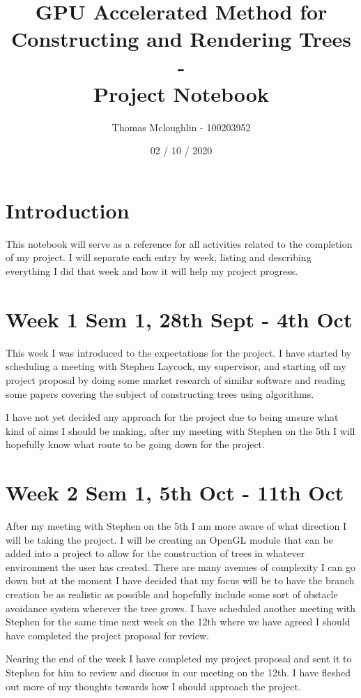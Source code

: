 \documentclass[11pt]{article}
\title{GPU Accelerated Method for Constructing and Rendering Trees 
        \\ - \\ 
        Project Notebook}
\author{Thomas Mcloughlin - 100203952}
\date{02 / 10 / 2020}
\begin{document}
\maketitle

\pagebreak
\section*{Introduction}
This notebook will serve as a reference for all activities related to the completion
of my project. I will separate each entry by week, listing and describing everything
I did that week and how it will help my project progress.

\section*{Week 1 Sem 1, 28th Sept - 4th Oct}
This week I was introduced to the expectations for the project. I have started by 
scheduling a meeting with Stephen Laycock, my supervisor, and starting off my project 
proposal by doing some market research of similar software and reading some papers 
covering the subject of constructing trees using algorithms.

I have not yet decided any approach for the project due to being unsure what kind of 
aims I should be making, after my meeting with Stephen on the 5th I will hopefully 
know what route to be going down for the project.

\section*{Week 2 Sem 1, 5th Oct - 11th Oct}
After my meeting with Stephen on the 5th I am more aware of what direction I will be 
taking the project. I will be creating an OpenGL module that can be added into a 
project to allow for the construction of trees in whatever environment the user has 
created. There are many avenues of complexity I can go down but at the moment I have 
decided that my focus will be to have the branch creation be as realistic as possible 
and hopefully include some sort of obstacle avoidance system wherever the tree grows.
I have scheduled another meeting with Stephen for the same time next week on the 12th 
where we have agreed I should have completed the project proposal for review.

Nearing the end of the week I have completed my project proposal and sent it to 
Stephen for him to review and discuss in our meeting on the 12th. I have fleshed out 
more of my thoughts towards how I should approach the project.
\end{document}
